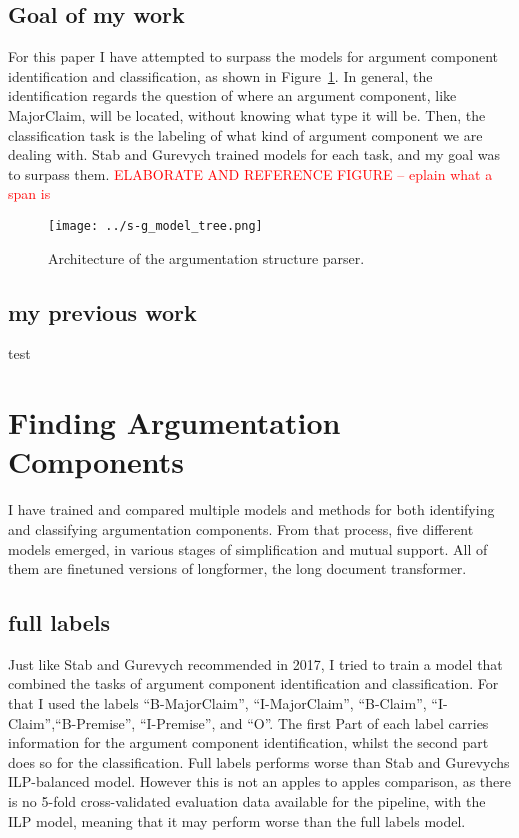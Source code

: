 \documentclass[12]{article}
\theoremstyle{mytheoremstyle}
\theoremstyle{mytheoremstyle}
\theoremstyle{myproblemstyle}
\begin{document}
  \subsection{Goal of my work}
  For this paper I have attempted to surpass the models for argument component identification and classification, as shown in Figure~\ref{fig:model_tree}. In general, the identification regards the question of where an argument component, like MajorClaim, will be located, without knowing what type it will be. Then, the classification task is the labeling of what kind of argument component we are dealing with. Stab and Gurevych trained models for each task, and my goal was to surpass them.  \textcolor{red}{ELABORATE AND REFERENCE FIGURE -- eplain what a span is} 
  \begin{figure}[!h]
    \centering
    \texttt{[image: ../s-g\_model\_tree.png]}
    \caption{Architecture of the argumentation structure parser.}
    \label{fig:model_tree}
  \end{figure}
  \subsection{my previous work}
  test
  \section{Finding Argumentation Components}
  I have trained and compared multiple models and methods for both identifying and classifying argumentation components. From that process, five different models emerged, in various stages of simplification and mutual support. All of them are finetuned versions of longformer\cite{beltagy2020longformer}, the long document transformer.
  \subsection{full labels}
  Just like Stab and Gurevych recommended in 2017, I tried to train a model that combined the tasks of argument component identification and classification. For that I used the labels ``B-MajorClaim'', ``I-MajorClaim'', ``B-Claim'', ``I-Claim'',``B-Premise'', ``I-Premise'', and ``O''. The first Part of each label carries information for the argument component identification, whilst the second part does so for the classification. Full labels performs worse than Stab and Gurevychs ILP-balanced model\cite{stab-gurevych-2017-parsing}. However this is not an apples to apples comparison, as there is no 5-fold cross-validated evaluation data available for the pipeline, with the ILP model, meaning that it may perform worse than the full labels model. 
\end{document}
